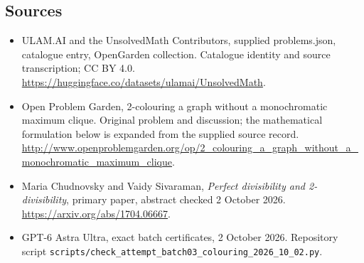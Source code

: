 \documentclass[11pt,a4paper]{article}
\begin{document}
\subsection{Sources}
\begin{itemize}
\item[S1] ULAM.AI and the UnsolvedMath Contributors, supplied problems.json, catalogue entry, OpenGarden collection. Catalogue identity and source transcription; CC BY 4.0.
\url{https://huggingface.co/datasets/ulamai/UnsolvedMath}.
\item[S2] Open Problem Garden, 2-colouring a graph without a monochromatic maximum clique. Original problem and discussion; the mathematical formulation below is expanded from the supplied source record.
\url{http://www.openproblemgarden.org/op/2_colouring_a_graph_without_a_monochromatic_maximum_clique}.

\item[R1] Maria Chudnovsky and Vaidy Sivaraman, \emph{Perfect divisibility
and 2-divisibility}, primary paper, abstract checked 2 October 2026.
\url{https://arxiv.org/abs/1704.06667}.
\item[R2] GPT-6 Astra Ultra, exact batch certificates, 2 October 2026.
Repository script \texttt{scripts/check\_attempt\_batch03\_colouring\_2026\_10\_02.py}.

\end{itemize}
\end{document}
